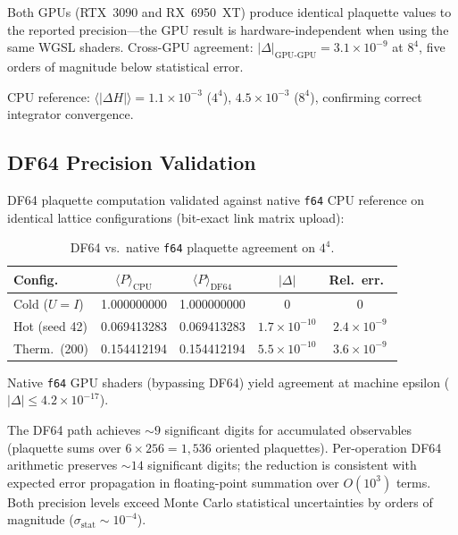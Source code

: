 \documentclass[aps,prl,twocolumn,superscriptaddress,showpacs]{revtex4-2}
\begin{document}
Both GPUs (RTX~3090 and RX~6950~XT) produce identical plaquette values
to the reported precision---the GPU result is hardware-independent when
using the same WGSL shaders. Cross-GPU agreement:
$|\Delta|_\text{GPU-GPU} = 3.1 \times 10^{-9}$ at $8^4$, five orders of
magnitude below statistical error.

CPU reference: $\langle|\Delta H|\rangle = 1.1 \times 10^{-3}$ ($4^4$),
$4.5 \times 10^{-3}$ ($8^4$), confirming correct integrator convergence.

\subsection{DF64 Precision Validation}
\label{sec:df64precision}

DF64 plaquette computation validated against native \texttt{f64} CPU
reference on identical lattice configurations (bit-exact link matrix
upload):

\begin{table}[h]
\caption{DF64 vs.\ native \texttt{f64} plaquette agreement on $4^4$.}
\label{tab:df64}
\begin{ruledtabular}
\begin{tabular}{lcccc}
Config.\ & $\langle P\rangle_\text{CPU}$ &
  $\langle P\rangle_\text{DF64}$ & $|\Delta|$ & Rel.\ err.\ \\
\midrule
Cold ($U{=}I$) & 1.000000000 & 1.000000000 & 0 & 0 \\
Hot (seed 42) & 0.069413283 & 0.069413283 & $1.7{\times}10^{-10}$ & $2.4{\times}10^{-9}$ \\
Therm.\ (200) & 0.154412194 & 0.154412194 & $5.5{\times}10^{-10}$ & $3.6{\times}10^{-9}$ \\
\end{tabular}
\end{ruledtabular}
\end{table}

Native \texttt{f64} GPU shaders (bypassing DF64) yield agreement at
machine epsilon ($|\Delta| \leq 4.2 \times 10^{-17}$).

The DF64 path achieves ${\sim}9$ significant digits for accumulated
observables (plaquette sums over $6 \times 256 = 1{,}536$ oriented
plaquettes). Per-operation DF64 arithmetic preserves ${\sim}14$
significant digits; the reduction is consistent with expected error
propagation in floating-point summation over $O(10^3)$ terms. Both
precision levels exceed Monte Carlo statistical uncertainties by orders
of magnitude ($\sigma_\text{stat} \sim 10^{-4}$).
\end{document}

